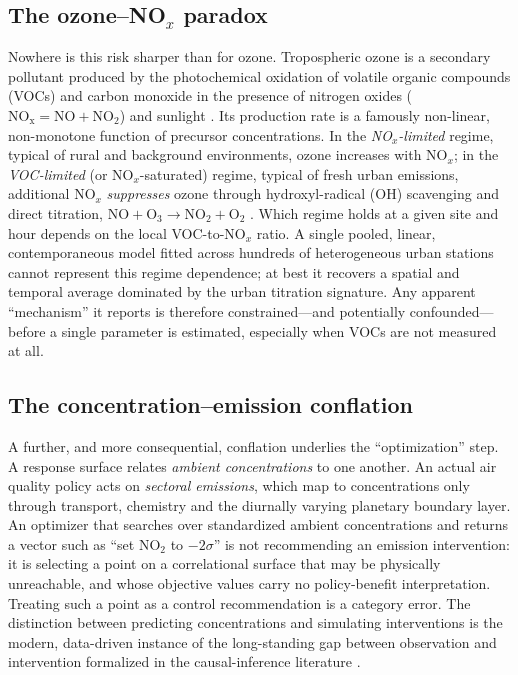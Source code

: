 \subsection{The ozone--\texorpdfstring{NO$_x$}{NOx} paradox}
Nowhere is this risk sharper than for ozone. Tropospheric ozone is a secondary
pollutant produced by the photochemical oxidation of volatile organic compounds (VOCs)
and carbon monoxide in the presence of nitrogen oxides
($\mathrm{NO_x}=\mathrm{NO}+\mathrm{NO_2}$) and sunlight \citep{seinfeld2016atmospheric,
monks2015ozone}. Its production rate is a famously non-linear, non-monotone function of
precursor concentrations. In the \emph{NO$_x$-limited} regime, typical of rural and
background environments, ozone increases with NO$_x$; in the \emph{VOC-limited} (or
NO$_x$-saturated) regime, typical of fresh urban emissions, additional NO$_x$
\emph{suppresses} ozone through hydroxyl-radical (OH) scavenging and direct titration,
$\mathrm{NO}+\mathrm{O_3}\rightarrow\mathrm{NO_2}+\mathrm{O_2}$ \citep{sillman1999}.
Which regime holds at a given site and hour depends on the local VOC-to-NO$_x$ ratio.
A single pooled, linear, contemporaneous model fitted across hundreds of heterogeneous
urban stations cannot represent this regime dependence; at best it recovers a spatial
and temporal average dominated by the urban titration signature. Any apparent
``mechanism'' it reports is therefore constrained---and potentially confounded---before
a single parameter is estimated, especially when VOCs are not measured at all.

\subsection{The concentration--emission conflation}
A further, and more consequential, conflation underlies the ``optimization'' step. A
response surface relates \emph{ambient concentrations} to one another. An actual air
quality policy acts on \emph{sectoral emissions}, which map to concentrations only
through transport, chemistry and the diurnally varying planetary boundary layer. An
optimizer that searches over standardized ambient concentrations and returns a vector
such as ``set NO$_2$ to $-2\sigma$'' is not recommending an emission intervention: it
is selecting a point on a correlational surface that may be physically unreachable,
and whose objective values carry no policy-benefit interpretation. Treating such a
point as a control recommendation is a category error. The distinction between
predicting concentrations and simulating interventions is the modern, data-driven
instance of the long-standing gap between observation and intervention formalized in
the causal-inference literature \citep{pearl2009causality,peters2017elements}.

